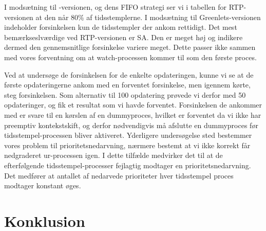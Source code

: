 I modsætning til -versionen, og dens FIFO strategi ser vi i tabellen for RTP-versionen at den  når 80\% af tidsstemplerne. I modsætning til Greenlets-versionen indeholder forsinkelsen kun de tidsstempler der ankom rettidigt. Det mest bemærkseslværdige ved RTP-versionen er SA. Den er meget høj og indikere dermed den gennemsnitlige forsinkelse variere meget. Dette passer ikke sammen med vores forventning om at watch-processen kommer til som den første proces. 


Ved at undersøge de forsinkelsen for de enkelte opdateringen, kunne vi se at de første opdateringerne ankom med en forventet forsinkelse, men igennem  kørte, steg forsinkelsen. Som alternativ til 100 opdatering prøvede vi derfor med 50 opdateringer, og fik et resultat som vi havde forventet. Forsinkelsen de ankommer med er svare til en kørslen af en dummyproces, hvilket er forventet da vi ikke har preemptiv kontekstskift, og derfor nødvendigvis må afslutte en dummyproces før tidsstempel-processen bliver aktiveret. Yderligere undersøgelse sted bestemmer vores problem til prioritetsnedarvning, nærmere bestemt at vi ikke korrekt får nedgraderet ur-processen igen. I dette tilfælde medvirker det til at de efterfølgende tidsstempel-processer fejlagtig modtager en prioritetsnedarvning. Det medfører at antallet af nedarvede prioriteter  hver tidsstempel proces modtager konstant øges.


\section{Konklusion}
